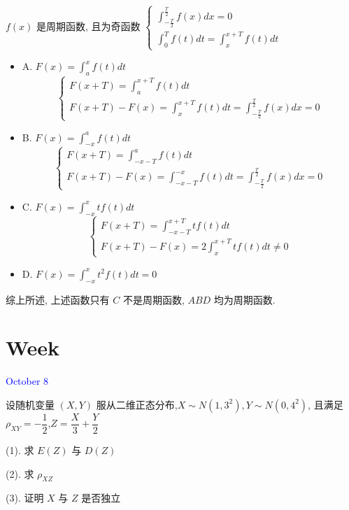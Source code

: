 \begin{solution}

	$f(x)$ 是周期函数, 且为奇函数 $
	\begin{cases}
		\displaystyle{\int_{-\frac{T}{2}}^{\frac{T}{2}}f(x)dx = 0}\\
		\displaystyle{\int_{0}^{T}f(t)dt = \int_{x}^{x+T}f(t)dt}
	\end{cases}$
	
	\begin{itemize}
		\item A. $\displaystyle{F(x) = \int_{a}^{x}f(t)dt}$
		$$
		\begin{cases}
			\displaystyle{F(x+T) = \int_{a}^{x+T}f(t)dt}\\
			\displaystyle{F(x+T)-F(x) = \int_{x}^{x+T}f(t)dt=\int_{-\frac{T}{2}}^{\frac{T}{2}}f(x)dx = 0}
		\end{cases}
		$$
		\item B. $\displaystyle{F(x)=\int_{-x}^{a}f(t)dt}$
		$$
		\begin{cases}
			\displaystyle{F(x+T) = \int_{-x-T}^{a}f(t)dt}\\
			\displaystyle{F(x+T)-F(x) = \int_{-x-T}^{-x}f(t)dt = \int_{-\frac{T}{2}}^{\frac{T}{2}}f(x)dx = 0}
		\end{cases}
		$$ 
		\item C. $\displaystyle{F(x)=\int_{-x}^{x}tf(t)dt}$
		$$
		\begin{cases}
			\displaystyle{F(x+T) = \int_{-x-T}^{x+T}tf(t)dt}\\
			\displaystyle{F(x+T)-F(x) = 2\int_{x}^{x+T}tf(t)dt\neq 0}
		\end{cases}
		$$ 
		\item D. $\displaystyle{F(x)=\int_{-x}^{x}t^{2}f(t)dt = 0}$
	\end{itemize}
	
	综上所述, 上述函数只有 $C$ 不是周期函数, $ABD$ 均为周期函数.
\end{solution}


\section{Week }
\textcolor{blue}{October 8}

\begin{example}[][Exam: 36.2.1]
	设随机变量 $(X,Y)$ 服从二维正态分布,$X\sim N(1,3^2),Y\sim N(0,4^2)$, 且满足 $\rho_{XY}=-\dfrac{1}{2}$,$Z=\dfrac{X}{3}+\dfrac{Y}{2}$

(1). 求 $E(Z)$ 与 $D(Z)$

(2). 求 $\rho_{XZ}$

(3). 证明 $X$ 与 $Z$ 是否独立
\end{example}

